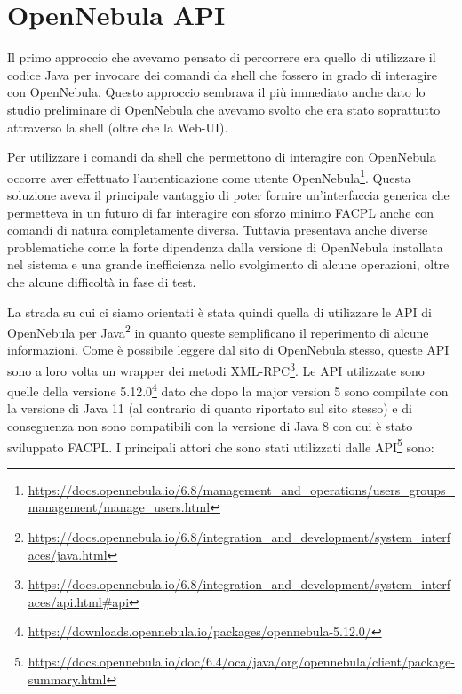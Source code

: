 \section{OpenNebula API}
Il primo approccio che avevamo pensato di percorrere era quello di utilizzare il codice Java per invocare dei comandi da shell che fossero in grado di interagire con OpenNebula. Questo approccio sembrava il più immediato anche dato lo studio preliminare di OpenNebula che avevamo svolto che era stato soprattutto attraverso la shell (oltre che la Web-UI).\par
Per utilizzare i comandi da shell che permettono di interagire con OpenNebula occorre aver effettuato l'autenticazione come utente OpenNebula\footnote{\url{https://docs.opennebula.io/6.8/management_and_operations/users_groups_management/manage_users.html}}.
Questa soluzione aveva il principale vantaggio di poter fornire un'interfaccia generica che permetteva in un futuro di far interagire con sforzo minimo FACPL anche con comandi di natura completamente diversa. Tuttavia presentava anche diverse problematiche come la forte dipendenza dalla versione di OpenNebula installata nel sistema e una grande inefficienza nello svolgimento di alcune operazioni, oltre che alcune difficoltà in fase di test.\par
La strada su cui ci siamo orientati è stata quindi quella di utilizzare le API di OpenNebula per Java\footnote{\url{https://docs.opennebula.io/6.8/integration_and_development/system_interfaces/java.html}} in quanto queste semplificano il reperimento di alcune informazioni. Come è possibile leggere dal sito di OpenNebula stesso, queste API sono a loro volta un wrapper dei metodi XML-RPC\footnote{\url{https://docs.opennebula.io/6.8/integration_and_development/system_interfaces/api.html\#api}}.
Le API utilizzate sono quelle della versione 5.12.0\footnote{\url{https://downloads.opennebula.io/packages/opennebula-5.12.0/}} dato che dopo la major version 5 sono compilate con la versione di Java 11 (al contrario di quanto riportato sul sito stesso) e di conseguenza non sono compatibili con la versione di Java 8 con cui è stato sviluppato FACPL.
I principali attori che sono stati utilizzati dalle API\footnote{\url{https://docs.opennebula.io/doc/6.4/oca/java/org/opennebula/client/package-summary.html}} sono:
